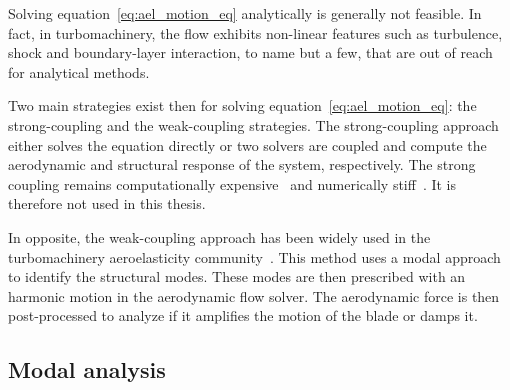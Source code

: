 
Solving equation~\ref{eq:ael_motion_eq} analytically is generally 
not feasible. In fact, in turbomachinery, 
the flow exhibits non-linear features such as turbulence, shock and
boundary-layer interaction, to name but a few, that are out of reach for
analytical methods.

Two main strategies exist then for solving equation~\ref{eq:ael_motion_eq}:
the strong-coupling and the weak-coupling strategies. The strong-coupling 
approach either solves the equation directly or two solvers are coupled and 
compute the aerodynamic and structural response of the system, respectively.
The strong coupling remains computationally expensive~\cite{Bartels2007}
and numerically stiff~\cite{Datta2008}.
It is therefore not used in this thesis.

In opposite, the weak-coupling approach has been widely used
in the turbomachinery aeroelasticity community~\cite{Marshall1996}.
This method uses a modal approach to identify the structural modes.
These modes are then prescribed with an harmonic motion in the aerodynamic
flow solver. The aerodynamic force is then post-processed to 
analyze if it amplifies the motion of the blade or damps it.

\subsection{Modal analysis}
\label{sub:modal_analysis}

